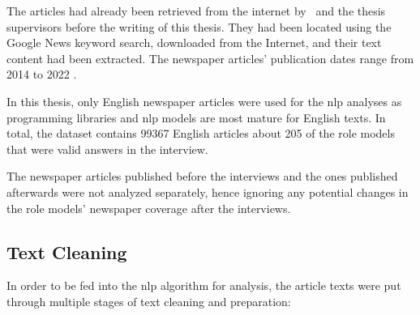 The articles had already been retrieved from the internet by~\textcite{fenske_using_2022} and the thesis supervisors before the writing of this thesis. They had been located using the Google News keyword search, downloaded from the Internet, and their text content had been extracted. The newspaper articles' publication dates range from 2014 to 2022 \autocite{fenske_using_2022}.

In this thesis, only English newspaper articles were used for the \gls{nlp} analyses as programming libraries and \gls{nlp} models are most mature for English texts. In total, the dataset contains \SI{99367}{} English articles about \SI{205}{} of the role models that were valid answers in the interview.

The newspaper articles published before the interviews and the ones published afterwards were not analyzed separately, hence ignoring any potential changes in the role models' newspaper coverage after the interviews.


\subsection*{Text Cleaning}
In order to be fed into the \gls{nlp} algorithm for analysis, the article texts were put through multiple stages of text cleaning and preparation:


